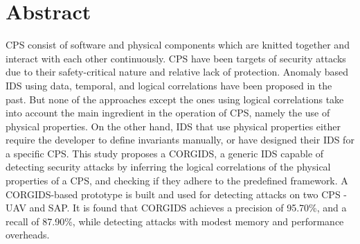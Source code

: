 
\chapter{Abstract}

 \ac{CPS} consist of software and physical components which are knitted together and interact with each other continuously. \ac{CPS} have been targets of security attacks due to their safety-critical nature and relative lack of protection. Anomaly based \ac{IDS} using data, temporal, and logical correlations have been proposed in the past. But none of the approaches except the ones using logical correlations take into account the main ingredient in the operation of \ac{CPS}, namely the use of physical properties. On the other hand, \ac{IDS} that use physical properties either require the developer to define invariants manually, or have designed their \ac{IDS} for a specific \ac{CPS}. This study proposes a \ac{CORGIDS}, a generic \ac{IDS} capable of detecting security attacks by inferring the logical correlations of the physical properties of a \ac{CPS}, and checking if they adhere to the predefined framework. A \ac{CORGIDS}-based prototype is built and used for detecting attacks on two \ac{CPS} - \ac{UAV} and \ac{SAP}. It is found that \ac{CORGIDS} achieves a precision of  95.70\%, and a recall of 87.90\%, while detecting attacks with modest memory and performance overheads.

